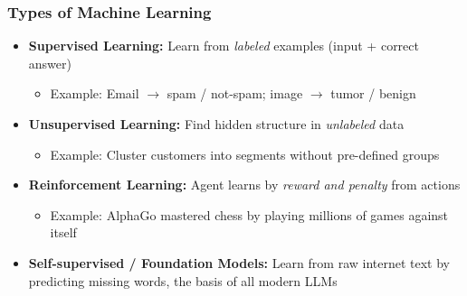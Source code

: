 \begin{frame}[fragile]\frametitle{Types of Machine Learning}
\begin{itemize}
\item \textbf{Supervised Learning:} Learn from \textit{labeled} examples (input + correct answer)
  \begin{itemize}
  \item Example: Email $\rightarrow$ spam / not-spam; image $\rightarrow$ tumor / benign
  \end{itemize}
\item \textbf{Unsupervised Learning:} Find hidden structure in \textit{unlabeled} data
  \begin{itemize}
  \item Example: Cluster customers into segments without pre-defined groups
  \end{itemize}
\item \textbf{Reinforcement Learning:} Agent learns by \textit{reward and penalty} from actions
  \begin{itemize}
  \item Example: AlphaGo mastered chess by playing millions of games against itself
  \end{itemize}
\item \textbf{Self-supervised / Foundation Models:} Learn from raw internet text by predicting missing words, the basis of all modern LLMs
\end{itemize}
\end{frame}

